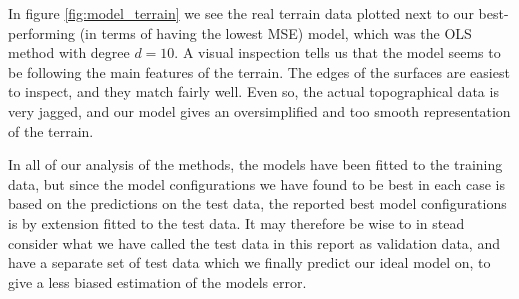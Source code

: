 In figure \ref{fig:model_terrain} we see the real terrain data plotted next to our best-performing (in terms of having the lowest MSE) model, which was the OLS method with degree $d=10$. A visual inspection tells us that the model seems to be following the main features of the terrain. The edges of the surfaces are easiest to inspect, and they match fairly well. Even so, the actual topographical data is very jagged, and our model gives an oversimplified and too smooth representation of the terrain.

In all of our analysis of the methods, the models have been fitted to the training data, but since the model configurations we have found to be best in each case is based on the predictions on the test data, the reported best model configurations is by extension fitted to the test data. It may therefore be wise to in stead consider what we have called the test data in this report as validation data, and have a separate set of test data which we finally predict our ideal model on, to give a less biased estimation of the models error.